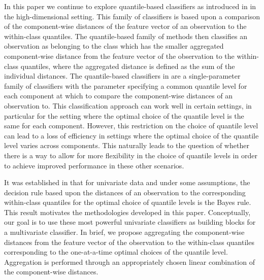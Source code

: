 In this paper we continue to explore quantile-based classifiers as introduced in
\cite{hennig2016} in the high-dimensional setting.  This family of classifiers
is based upon a comparison of the component-wise distances of the feature vector
of an observation to the within-class quantiles.  The quantile-based family of
methods then classifies an observation as belonging to the class which has the
smaller aggregated component-wise distance from the feature vector of the
observation to the within-class quantiles, where the aggregated distance is
defined as the sum of the individual distances.  The quantile-based classifiers
in \cite{hennig2016} are a single-parameter family of classifiers with the
parameter specifying a common quantile level for each component at which to
compare the component-wise distances of an observation to.  This classification
approach can work well in certain settings, in particular for the setting where
the optimal choice of the quantile level is the same for each component.
However, this restriction on the choice of quantile level can lead to a loss of
efficiency in settings where the optimal choice of the quantile level varies
across components.  This naturally leads to the question of whether there is a
way to allow for more flexibility in the choice of quantile levels in order to
achieve improved performance in these other scenarios.

It was established in \cite{hennig2016} that for univariate data and under some
assumptions, the decision rule based upon the distances of an observation to the
corresponding within-class quantiles for the optimal choice of quantile levels
is the Bayes rule.  This result motivates the methodologies developed in this
paper.  Conceptually, our goal is to use these most powerful univariate
classifiers as building blocks for a multivariate classifier.  In brief, we
propose aggregating the component-wise distances from the feature vector of the
observation to the within-class quantiles corresponding to the one-at-a-time
optimal choices of the quantile level.  Aggregation is performed through an
appropriately chosen linear combination of the component-wise distances.

